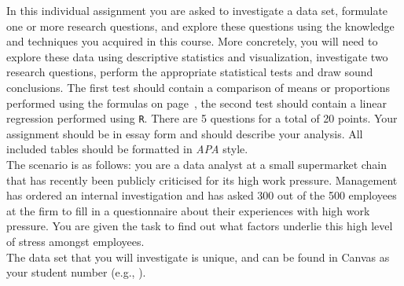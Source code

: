 {\footnotesize

In this individual assignment you are asked to investigate a data set, formulate one or more research questions, and explore these questions using the knowledge and techniques you acquired in this course. More concretely, you will need to explore these data using descriptive statistics and visualization, investigate two research questions, perform the appropriate statistical tests and draw sound conclusions. The first test should contain a comparison of means or proportions performed using the formulas on page~\pageref{formulasheet}, the second test should contain a linear regression performed using \texttt{R}. There are 5 questions for a total of 20 points. Your assignment should be in essay form and should describe your analysis. All included tables should be formatted in \textit{APA} style. \\

The scenario is as follows: you are a data analyst at a small supermarket chain that has recently been publicly criticised for its high work pressure. Management has ordered an internal investigation and has asked 300 out of the 500 employees at the firm to fill in a questionnaire about their experiences with high work pressure. You are given the task to find out what factors underlie this high level of stress amongst employees. \\

The data set that you will investigate is unique, and can be found in Canvas as your student number (e.g., ). \\

}

